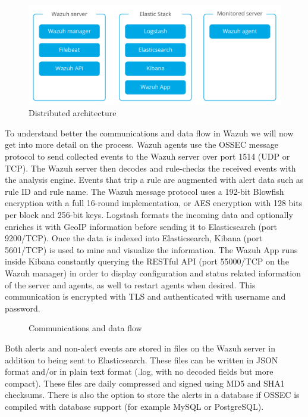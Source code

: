 \begin{figure}[H]
  \centering
	\includegraphics[width=\textwidth]{figuras/wazuh_distributed.png}
	\caption{Distributed architecture}
\end{figure}
\linej
To understand better the communications and data flow in Wazuh we will now get into more detail on the process\cite{wazuh_architecture2}\cite{wazuh_data_flow}.
\linej
\linej
Wazuh agents use the OSSEC message protocol to send collected events to the Wazuh server over port 1514 (UDP or TCP). The Wazuh server then decodes and rule-checks the received events with the analysis engine. Events that trip a rule are augmented with alert data such as rule ID and rule name. The Wazuh message protocol uses a 192-bit Blowfish encryption with a full 16-round implementation, or AES encryption with 128 bits per block and 256-bit keys.
\linej
Logstash formats the incoming data and optionally enriches it with GeoIP information before sending it to Elasticsearch (port 9200/TCP). Once the data is indexed into Elasticsearch, Kibana (port 5601/TCP) is used to mine and visualize the information.
\linej
The Wazuh App runs inside Kibana constantly querying the RESTful API (port 55000/TCP on the Wazuh manager) in order to display configuration and status related information of the server and agents, as well to restart agents when desired. This communication is encrypted with TLS and authenticated with username and password.

\begin{figure}[H]
  \centering
	\caption{Communications and data flow}
\end{figure}
\linej
Both alerts and non-alert events are stored in files on the Wazuh server in addition to being sent to Elasticsearch. These files can be written in JSON format and/or in plain text format (.log, with no decoded fields but more compact). These files are daily compressed and signed using MD5 and SHA1 checksums.
There is also the option to store the alerts in a database if OSSEC is compiled with database support (for example MySQL or PostgreSQL)\cite{libro_ossec}.

